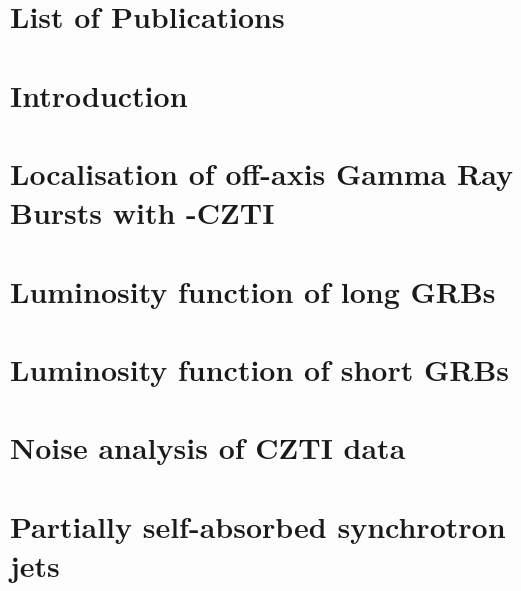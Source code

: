 \documentclass[12pt, %
english, %
singlespacing, %
2%
headsepline, %
]{MastersDoctoralThesis} %
\begin{document}
\chapter*{List of Publications}

\cleardoublepage






\mainmatter
\pagestyle{thesis}


\chapter{Introduction}
\label{chap:introduction}


\chapter[Localisation of off-axis CZTI GRBs]{Localisation of off-axis Gamma Ray Bursts with \AS-CZTI}
\label{chap:localisation}

	
\chapter{Luminosity function of long GRBs}
\label{chap:LGRBs}


\chapter{Luminosity function of short GRBs}
\label{chap:SGRBs}


%

\chapter{Noise analysis of CZTI data}
\label{chap:noise}


\chapter{Partially self-absorbed synchrotron jets}
\label{chap:jet_model}


\end{document}

